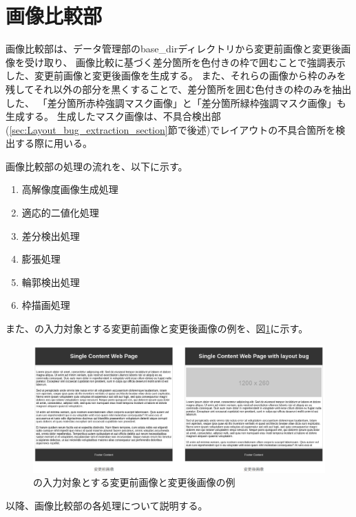 \section{画像比較部}\label{sec:Difference_extraction_section}
画像比較部は、データ管理部のbase\_dirディレクトリから変更前画像と変更後画像を受け取り、
画像比較に基づく差分箇所を色付きの枠で囲むことで強調表示した、変更前画像と変更後画像を生成する。
また、それらの画像から枠のみを残してそれ以外の部分を黒くすることで、差分箇所を囲む色付きの枠のみを抽出した、
「差分箇所赤枠強調マスク画像」と「差分箇所緑枠強調マスク画像」も生成する。
生成したマスク画像は、不具合検出部(\ref{sec:Layout_bug_extraction_section}節で後述)でレイアウトの不具合箇所を検出する際に用いる。
\par
画像比較部の処理の流れを、以下に示す。
\begin{enumerate}
    \item 高解像度画像生成処理
    \item 適応的二値化処理
    \item 差分検出処理
    \item 膨張処理
    \item 輪郭検出処理
    \item 枠描画処理
\end{enumerate}
また、\toolName の入力対象とする変更前画像と変更後画像の例を、図\ref{fig: img_original_bf_af}に示す。
\begin{figure}[tp]
    \begin{center}
        \includegraphics[width=1.0\columnwidth]{image/4_img_original_bf_af.png}
        \caption{\toolName の入力対象とする変更前画像と変更後画像の例}
        \label{fig: img_original_bf_af}
    \end{center}
\end{figure}
以降、画像比較部の各処理について説明する。

